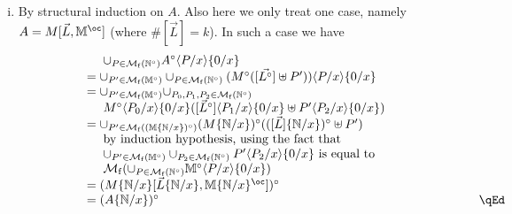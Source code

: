 \documentclass{LMCS}
\newcommand{\card}[1]{\# #1}
\newcommand{\bang}{\oc}
\newcommand{\subst}[2]{\{ #2 / #1 \}}	\newcommand{\dg}[2]{\mathrm{deg}_{#1}(#2)} \newcommand{\obsle}{\sqsubseteq_{\mathcal{O}}}
\newcommand{\TE}[1]{#1^{\circ}} \newcommand{\at}{\!::\!}
\newcommand{\Mfin}[1]{\mathcal{M}_{\mathrm{f}}(#1)}
\newcommand{\mcup}{\uplus}
\newcommand{\seq}[1]{\vec{#1}}
\newcommand{\sM}{\mathbb{M}}
\newcommand{\sN}{\mathbb{N}}
\begin{document}
\begin{enumerate}[(i)]
\item By structural induction on $A$.
Also here we only treat one case, namely $A = M[\seq L,\sM^\bang]$ (where $\card{[\seq {L}]} = k$). In such a case we have
$$
\hspace{-2pt}
\begin{array}{ll}
& \ \ \ \ \cup_{P\in\Mfin{\TE{\sN}}} \TE{A}\lsubst{x}{P}\subst{x}{0} \\
& = \cup_{P' \in \Mfin{\TE{\sM}}} \cup_{P\in\Mfin{\TE{\sN}}} (\TE{M}([\seq {\TE{L}}] \mcup P'))\lsubst{x}{P}\subst{x}{0} \\
& = \cup_{P' \in \Mfin{\TE{\sM}}}\cup_{P_0,P_1,P_2 \in\Mfin{\TE{\sN}}} \\
& \ \ \ \ \TE{M}\lsubst{x}{P_0}\subst{x}{0}([\TE{\seq {L}}]\lsubst{x}{P_1}\subst{x}{0} \mcup P'\lsubst{x}{P_{2}}\subst{x}{0}) \\
& = \cup_{P' \in \Mfin{\TE{(\sM\subst{x}{\sN})}}} \TE{(M\subst{x}{\sN})}(\TE{([\seq {L}]\subst{x}{\sN})} \mcup P') \\
& \ \ \ \ \textrm{by induction hypothesis, using the fact that 	} \\
& \ \ \ \	\cup_{P' \in \Mfin{\TE{\sM}}}\cup_{P_2 \in\Mfin{\TE{\sN}}}P'\lsubst{x}{P_{2}}\subst{x}{0}\textrm{ is equal to }\\
& \ \ \ \	\Mfin{\cup_{P\in\Mfin{\TE{\sN}}}\TE{\sM}\lsubst{x}{P}\subst{x}{0}}\\
& = \TE{(M\subst{x}{\sN}[\seq {L}\subst{x}{\sN},\sM\subst{x}{\sN}^\bang])} \\
& = \TE{(A\subst{x}{\sN})}\rlap{\hbox to279 pt{\hfill\qEd}}
\end{array}
$$
\end{enumerate}

 
\end{document}

